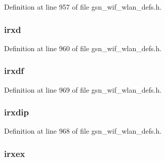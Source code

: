 Definition at line 957 of file gsn\_\-wif\_\-wlan\_\-defs.h.

\hypertarget{a00398_a8916fd620005100e51c3c968296abe39}{
\subsubsection[{irxd}]{ {\bf irxd}}}
\label{a00398_a8916fd620005100e51c3c968296abe39}


Definition at line 960 of file gsn\_\-wif\_\-wlan\_\-defs.h.

\hypertarget{a00398_af490a64f28af85e95747fbad531023ab}{
\subsubsection[{irxdf}]{ {\bf irxdf}}}
\label{a00398_af490a64f28af85e95747fbad531023ab}


Definition at line 969 of file gsn\_\-wif\_\-wlan\_\-defs.h.

\hypertarget{a00398_a21f0f4c619c1deba6dd17f280bbb46fb}{
\subsubsection[{irxdip}]{ {\bf irxdip}}}
\label{a00398_a21f0f4c619c1deba6dd17f280bbb46fb}


Definition at line 968 of file gsn\_\-wif\_\-wlan\_\-defs.h.

\hypertarget{a00398_ae9db132da0f78d4fccdb6d61ef3d4c1c}{
\subsubsection[{irxex}]{ {\bf irxex}}}
\label{a00398_ae9db132da0f78d4fccdb6d61ef3d4c1c}


